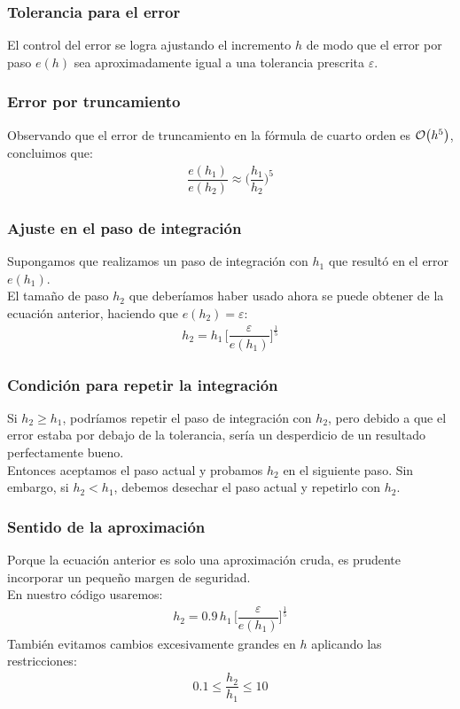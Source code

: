 \documentclass[12pt]{beamer}
\begin{document}
\begin{frame}
\frametitle{Tolerancia para el error}
El control del error se logra ajustando el incremento $h$ de modo que el error por paso $e (h)$ sea aproximadamente igual a una tolerancia prescrita $\varepsilon$.
\end{frame}
\begin{frame}
\frametitle{Error por truncamiento}
Observando que el error de truncamiento en la fórmula de cuarto orden es $\order{h^{5}}$, concluimos que:
\pause
\begin{align*}
\dfrac{e (h_{1})}{e (h_{2})} \approx \bigg( \dfrac{h_{1}}{h_{2}} \bigg)^{5}
\end{align*}
\end{frame}
\begin{frame}
\frametitle{Ajuste en el paso de integración}
Supongamos que realizamos un paso de integración con $h_{1}$ que resultó en el error $e (h_{1})$.
\\
\bigskip
\pause
El tamaño de paso $h_{2}$ que deberíamos haber usado ahora se puede obtener de la ecuación anterior, haciendo que $e (h_{2}) = \varepsilon$:
\pause
\begin{align*}
h_{2} = h_{1} \, \bigg[ \dfrac{\varepsilon}{e (h_{1})} \bigg]^{\frac{1}{5}}
\end{align*}
\end{frame}
\begin{frame}
\frametitle{Condición para repetir la integración}
Si $h_{2} \geq h_{1}$, podríamos repetir el paso de integración con $h_{2}$, pero debido a que el error estaba por debajo de la tolerancia, sería un desperdicio de un resultado perfectamente bueno.
\\
\bigskip
\pause
Entonces aceptamos el paso actual y probamos $h_{2}$ en el siguiente paso. \pause Sin embargo, si $h_{2} < h_{1}$, debemos desechar el paso actual y repetirlo con $h_{2}$.
\end{frame}
\begin{frame}
\frametitle{Sentido de la aproximación}
Porque la ecuación anterior es solo una aproximación cruda, \pause es prudente incorporar un pequeño margen de seguridad.
\\
\bigskip
\pause
En nuestro código usaremos:
\pause
\begin{align*}
h_{2} = 0.9 \, h_{1} \, \bigg[ \dfrac{\varepsilon}{e (h_{1})} \bigg]^{\frac{1}{5}}
\end{align*}
\pause 
También evitamos cambios excesivamente grandes en $h$ aplicando las restricciones:
\pause
\begin{align*}
0.1 \leq \dfrac{h_{2}}{h_{1}} \leq 10
\end{align*}
\end{frame}
\end{document}
